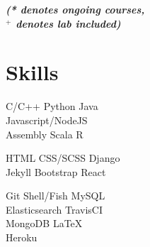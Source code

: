 \documentclass[a4paper]{deedy-resume} %
\begin{document}
\begin{minipage}[t]{0.30\textwidth}
  {\footnotesize \textit{\textbf{(* denotes ongoing courses, \\$^+$ denotes lab included) }}} \\

  \sectionspace

  \section{Skills}

  \runsubsection{}
  C/C++ \textbullet{} Python \textbullet{} Java \\
  \textbullet{} Javascript/NodeJS \\
  \textbullet{} Assembly \textbullet{} Scala \textbullet{} R

  \sectionspace
  \sectionspace

  HTML \textbullet{} CSS/SCSS \textbullet{} Django \\
  \textbullet{} Jekyll \textbullet{} Bootstrap \textbullet{} React

  \sectionspace
  \sectionspace

  Git \textbullet{} Shell/Fish \textbullet{} MySQL\\
  \textbullet{} Elasticsearch \textbullet{} TravisCI \\
  \textbullet{} MongoDB \textbullet{} \LaTeX\\
  \textbullet{} Heroku
  
\end{minipage}
\hfill
\end{document}
